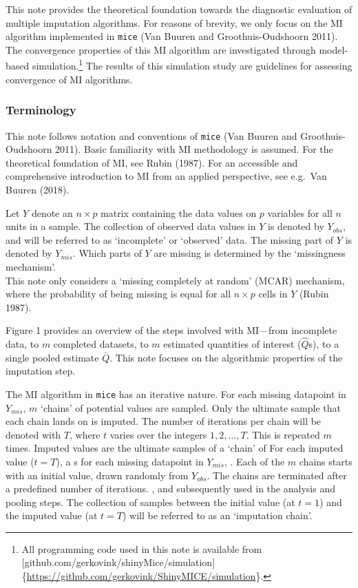 \documentclass[
]{article}
\begin{document}
This note provides the theoretical foundation towards the diagnostic
evaluation of multiple imputation algorithms. For reasons of brevity, we
only focus on the MI algorithm implemented in \texttt{mice} (Van Buuren
and Groothuis-Oudshoorn 2011). The convergence properties of this MI
algorithm are investigated through model-based simulation.\footnote{All
  programming code used in this note is available from
  {[}github.com/gerkovink/shinyMice/simulation{]}\{\url{https://github.com/gerkovink/ShinyMICE/simulation}\}.}
The results of this simulation study are guidelines for assessing
convergence of MI algorithms.

\hypertarget{terminology}{%
\subsubsection{Terminology}\label{terminology}}

This note follows notation and conventions of \texttt{mice} (Van Buuren
and Groothuis-Oudshoorn 2011). Basic familiarity with MI methodology is
assumed. For the theoretical foundation of MI, see Rubin (1987). For an
accessible and comprehensive introduction to MI from an applied
perspective, see e.g.~Van Buuren (2018).

Let \(Y\) denote an \(n \times p\) matrix containing the data values on
\(p\) variables for all \(n\) units in a sample. The collection of
observed data values in \(Y\) is denoted by \(Y_{obs}\), and will be
referred to as `incomplete' or `observed' data. The missing part of
\(Y\) is denoted by \(Y_{mis}\). Which parts of \(Y\) are missing is
determined by the `missingness mechanism'.\\
This note only considers a `missing completely at random' (MCAR)
mechanism, where the probability of being missing is equal for all
\(n \times p\) cells in \(Y\) (Rubin 1987).

Figure 1 provides an overview of the steps involved with MI---from
incomplete data, to \(m\) completed datasets, to \(m\) estimated
quantities of interest (\(\hat{Q}\)s), to a single pooled estimate
\(\bar{Q}\). This note focuses on the algorithmic properties of the
imputation step.

The MI algorithm in \texttt{mice} has an iterative nature. For each
missing datapoint in \(Y_{mis}\), \(m\) `chains' of potential values are
sampled. Only the ultimate sample that each chain lands on is imputed.
The number of iterations per chain will be denoted with \(T\), where
\(t\) varies over the integers \(1, 2, \dots, T\). This is repeated
\(m\) times. Imputed values are the ultimate samples of a `chain' of For
each imputed value (\(t = T\)), a s for each missing datapoint in
\(Y_{mis}\), . Each of the \(m\) chains starts with an initial value,
drawn randomly from \(Y_{obs}\). The chains are terminated after a
predefined number of iterations. , and subsequently used in the analysis
and pooling steps. The collection of samples between the initial value
(at \(t=1\)) and the imputed value (at \(t=T\)) will be referred to as
an `imputation chain'.
\end{document}
